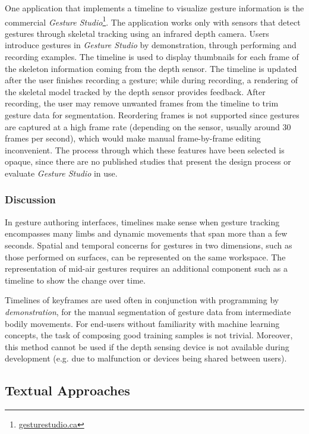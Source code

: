 One application that implements a timeline to visualize gesture information is the commercial \emph{Gesture Studio}\footnote{\href{http://www.gesturestudio.ca}{gesturestudio.ca}}. The application works only with sensors that detect gestures through skeletal tracking using an infrared depth camera. Users introduce gestures in \emph{Gesture Studio} by demonstration, through performing and recording examples. The timeline is used to display thumbnails for each frame of the skeleton information coming from the depth sensor. The timeline is updated after the user finishes recording a gesture; while during recording, a rendering of the skeletal model tracked by the depth sensor provides feedback. After recording, the user may remove unwanted frames from the timeline to trim gesture data for segmentation. Reordering frames is not supported since gestures are captured at a high frame rate (depending on the sensor, usually around 30 frames per second), which would make manual frame-by-frame editing inconvenient. The process through which these features have been selected is opaque, since there are no published studies that present the design process or evaluate \emph{Gesture Studio} in use.

\subsubsection{Discussion}

In gesture authoring interfaces, timelines make sense when gesture tracking encompasses many limbs and dynamic movements that span more than a few seconds. Spatial and temporal concerns for gestures in two dimensions, such as those performed on surfaces, can be represented on the same workspace. The representation of mid-air gestures requires an additional component such as a timeline to show the change over time.

Timelines of keyframes are used often in conjunction with programming by \emph{demonstration}, for the manual segmentation of gesture data from intermediate bodily movements. For end-users without familiarity with machine learning concepts, the task of composing good training samples is not trivial. Moreover, this method cannot be used if the depth sensing device is not available during development (e.g. due to malfunction or devices being shared between users).

\subsection{Textual Approaches}

